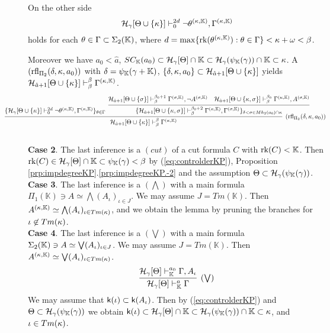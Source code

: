 \documentclass{article}
\newcommand{\mK}{\mathbb{K}}
\begin{document}
On the other side
\[
\mathcal{H}_{\gam}[\Tht\cup\{\kap\}]\vdash^{2d}_{0}\lnot\tht^{(\kap,\mK)},\Gam^{(\kap,\mK)}
\]
holds
for each $\tht\in\Gam\subset\Sig_{2}(\mK)$, where
$d=\max\{\rk(\tht^{(\kap,\mK)}):\tht\in\Gam\}<\kap+\ome<\bet$.


Moreover we have $a_{0}<\hat{a}$,
$SC_{\mK}(a_{0})\subset\calh_{\gam}[\Tht]\cap\mK\subset\calh_{\gam}(\psi_{\mK}(\gam))\cap\mK\subset\kap$.
A $({\rm rfl}_{\Pi_{2}}(\delta,\kappa,a_{0}))$ with $\del=\psi_{\mK}(\gam+\mK)$,
$\{\delta,\kappa,a_{0}\}\subset{\cal H}_{\hat{a}+1}[\Theta\cup\{\kappa\}]$
yields
$\mathcal{H}_{\hat{a}+1}[\Tht\cup\{\kap\}]\vdash^{\bet}_{\bet}\Gam^{(\kap,\mK)}$.
{
\small
\[
\hspace{-13mm}
\infer[({\rm rfl}_{\Pi_{2}}(\del,\kap,a_{0}))]{\mathcal{H}_{\hat{a}+1}[\Tht\cup\{\kap\}]\vdash^{\bet}_{\bet}\Gam^{(\kap,\mK)}}
{
\{\mathcal{H}_{\gam}[\Tht\cup\{\kap\}]\vdash^{2d}_{0}\lnot\tht^{(\kap,\mK)},\Gam^{(\kap,\mK)}\}_{\tht\in\Gam}
&
\hspace{-2mm}
\infer{
\{\mathcal{H}_{\hat{a}+1}[\Tht\cup\{\kap,\sig\}]\vdash^{\bet_{0}+2}_{\bet}\Gamma^{(\kap,\mK)},\Gam^{(\sig,\mK)}\}_{
\del<\sig\in Mh_{2}(a_{0})\cap\kap
 }
}
 {
 \mathcal{H}_{\hat{a}+1}[\Tht\cup\{\sig\}]\vdash^{\bet_{0}+1}_{\bet}\Gamma^{(\sig,\mK)}, \lnot A^{(\sig,\mK)}
 &
 \mathcal{H}_{\hat{a}+1}[\Tht\cup\{\kap,\sig\}]\vdash^{\bet_{0}}_{\bet}\Gamma^{(\kap,\mK)}, 
A^{(\sig,\mK)}
 }
}
\]
}
\\
\textbf{Case 2}.
The last inference is a $(cut)$ of a cut formula $C$ with $\rk(C)<\mK$.
Then
$\rk(C)\in\calh_{\gam}[\Tht]\cap\mK\subset\psi_{\mK}(\gam)<\bet$ by (\ref{eq:controlderKP}),
Proposition \ref{prp:impdegreeKP}.\ref{prp:impdegreeKP.-2} and the assumption 
$\Tht\subset\calh_{\gam}(\psi_{\mK}(\gam))$.
\\
\textbf{Case 3}.
The last inference is a $(\bigwedge)$ with a main formula $\Pi_{1}(\mK)\ni A\simeq\bigwedge(A_{\iota})_{\iota\in J}$.
We may assume $J=Tm(\mK)$.
Then $A^{(\kap,\mK)}\simeq\bigwedge(A_{\iota})_{\iota\in Tm(\kap)}$, and
we obtain the lemma by pruning the branches for $\iota\not\in Tm(\kappa)$.
\\
\textbf{Case 4}.
The last inference is a $(\bigvee)$ with a main formula 
$\Sig_{2}(\mK)\ni A\simeq\bigvee(A_{\iota})_{\iota\in J}$.
We may assume $J=Tm(\mK)$.
Then $A^{(\kap,\mK)}\simeq\bigvee(A_{\iota})_{\iota\in Tm(\kap)}$.
\[
\infer[(\bigvee)]{\calh_{\gam}[\Tht]\vdash^{a}_{\mK}\Gam}
{
\mathcal{H}_{\gam}[\Tht]\vdash^{a_{0}}_{\mK}\Gamma, A_{\iota}
}
\]
We may assume that ${\sf k}(\iota)\subset{\sf k}(A_{\iota})$.
Then by (\ref{eq:controlderKP}) and $\Tht\subset\calh_{\gam}(\psi_{\mK}(\gam))$ we obtain
$\sfk(\iota)\subset\calh_{\gam}[\Tht]\cap\mK\subset\calh_{\gam}(\psi_{\mK}(\gam))\cap\mK\subset\kap$,
and $\iota\in Tm(\kappa)$.
\eprf
\\
\end{document}
